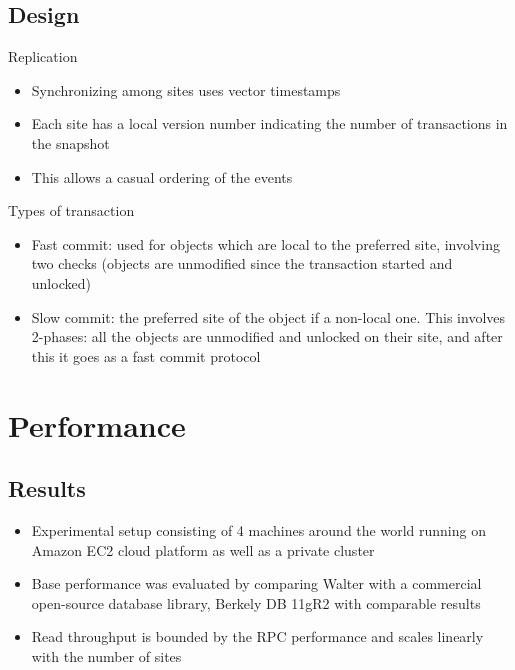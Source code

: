 \documentclass{beamer}
\begin{document}
	\subsection{Design}
	 	
	 	
		\begin{frame}{Replication}
				
		\begin{itemize}
		
		\item Synchronizing among sites uses vector timestamps
		\item Each site has a local version number indicating the number of transactions in the snapshot
		\item This allows a casual ordering of the events
		
		\end{itemize}
		
		\end{frame}	 	
		

		\begin{frame}{Types of transaction}
		
		\begin{itemize}
		
		\item Fast commit: used for objects which are local to the preferred site, involving two checks (objects are unmodified since the transaction started and unlocked)
		
		\item Slow commit: the preferred site of the object if a non-local one. This involves 2-phases: all the objects are unmodified and unlocked on their site, and after this it goes as a fast commit protocol		
		
		\end{itemize}

		\end{frame}
 	
	 	
\section{Performance}

	\subsection{Results}
	\begin{itemize}
	\item Experimental setup consisting of 4 machines around the world running on Amazon EC2 cloud platform as well as a private cluster
	\item Base performance was evaluated by comparing Walter with a commercial open-source database library, Berkely DB 11gR2 with comparable results
	\item Read throughput is bounded by the RPC performance and scales linearly with the number of sites
	
	\end{itemize}
	
\end{document}
